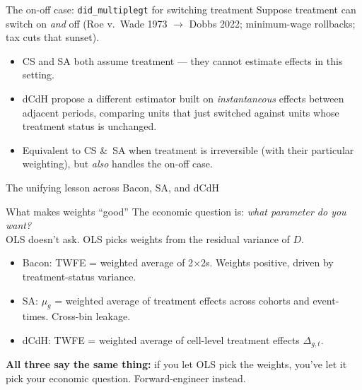\documentclass[aspectratio=169,11pt]{beamer}
\begin{document}
\begin{frame}{The on-off case: \texttt{did\_multiplegt} for switching treatment}
\vspace{0.5em}
Suppose treatment can switch on \textit{and} off (Roe v.\ Wade 1973 $\to$ Dobbs 2022; minimum-wage rollbacks; tax cuts that sunset).
\vspace{0.4em}
\begin{itemize}\small
  \item CS and SA both assume  treatment --- they cannot estimate effects in this setting.
  \item dCdH propose a different estimator built on \textit{instantaneous} effects between adjacent periods, comparing units that just switched against units whose treatment status is unchanged.
  \item Equivalent to CS \&\ SA when treatment is irreversible (with their particular weighting), but \textit{also} handles the on-off case.
\end{itemize}
\vspace{0.5em}
\end{frame}

\begin{frame}{The unifying lesson across Bacon, SA, and dCdH}
\begin{block}{What makes weights ``good''}
\centering
The economic question is: \textit{what parameter do you want?} \\[0.2em]
OLS doesn't ask. OLS picks weights from the residual variance of $D$.
\end{block}
\vspace{0.5em}
\begin{itemize}\small
  \item Bacon: TWFE = weighted average of 2$\times$2s. Weights positive, driven by treatment-status variance.
  \item SA: $\mu_g$ = weighted average of treatment effects across cohorts and event-times. Cross-bin leakage.
  \item dCdH: TWFE = weighted average of cell-level treatment effects $\Delta_{g,t}$. 
\end{itemize}
\vspace{0.5em}
\textbf{All three say the same thing:} if you let OLS pick the weights, you've let it pick your economic question. \;Forward-engineer instead.
\end{frame}
\end{document}
